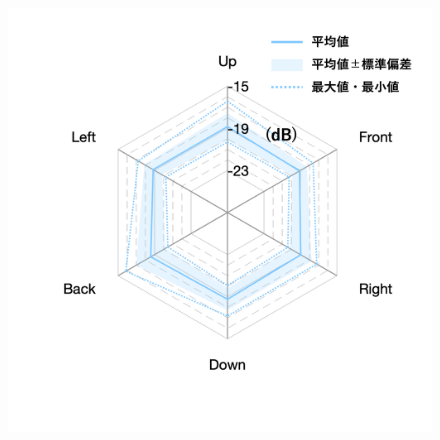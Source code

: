 \documentclass[11pt,a4j]{jreport}
\begin{document}
\begin{figure}[H]
\begin{minipage}[b]{.33\textwidth}
        \label{fig:S02late}
      \end{minipage}%
      \begin{minipage}[b]{.33\textwidth}
        \centering
        \includegraphics[width=1\linewidth]{images/realHallDirSt/late_S01_withLegend.png}
        \label{fig:S01late}
      \end{minipage}


\end{figure}
\end{document}
